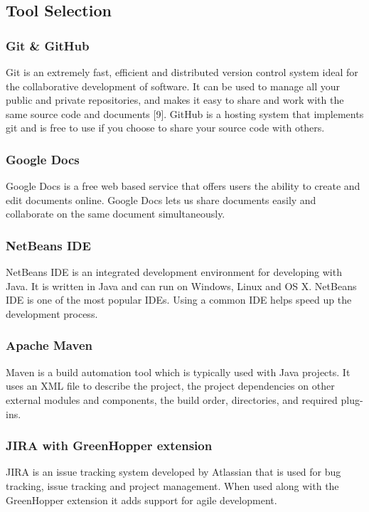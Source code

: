 \subsection{Tool Selection}

\subsubsection{Git \& GitHub}
Git is an extremely fast, efficient and distributed version control system ideal for the collaborative development of software. It can be used to manage all your public and private repositories, and makes it easy to share and work with the same source code and documents [9]. GitHub is a hosting system that implements git and is free to use if you choose to share your source code with others. 

\subsubsection{Google Docs}
Google Docs is a free web based service that offers users the ability to create and edit documents online. Google Docs lets us share documents easily and collaborate on the same document simultaneously.    

\subsubsection{NetBeans IDE}
NetBeans IDE is an integrated development environment for developing with Java. It is written in Java and can run on Windows, Linux and OS X. NetBeans IDE is one of the most popular IDEs. Using a common IDE helps speed up the development process.

\subsubsection{Apache Maven}
Maven is a build automation tool which is typically used with Java projects. It uses an XML file to describe the project, the project dependencies on other external modules and components, the build order, directories, and required plug-ins.   

\subsubsection{JIRA with GreenHopper extension}
JIRA is an issue tracking system developed by Atlassian that is used for bug tracking, issue tracking and project management. When used along with the GreenHopper extension it adds support for agile development.

